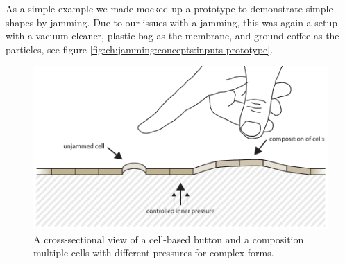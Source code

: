 As a simple example we made mocked up a prototype to demonstrate simple shapes by jamming.
Due to our issues with a jamming, this was again a setup with a vacuum cleaner, plastic bag as the membrane, and ground coffee as the particles, see figure \ref{fig:ch:jamming:concepts:inputs-prototype}.

\begin{figure}[h]
  \centering
  \includegraphics[width=.9\textwidth]{figures/jamming/concepts/jamming-inputs-concept.pdf}
  \caption{A cross-sectional view of a cell-based button and a composition multiple cells with different pressures for complex forms.}
  \label{fig:ch:jamming:concepts:button-cells}
\end{figure}


